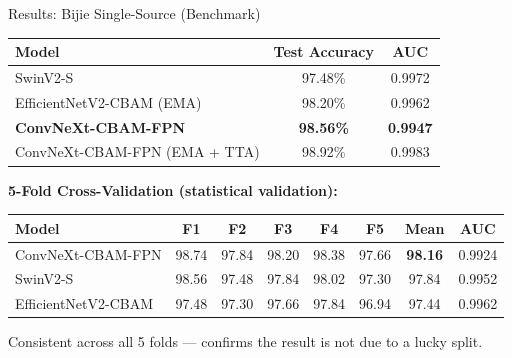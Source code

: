 \documentclass[aspectratio=169]{beamer}
\begin{document}
\begin{frame}{Results: Bijie Single-Source (Benchmark)}
    \begin{table}
        \centering
        \begin{tabular}{lcc}
            \toprule
            \textbf{Model} & \textbf{Test Accuracy} & \textbf{AUC} \\
            \midrule
            SwinV2-S & 97.48\% & 0.9972 \\
            EfficientNetV2-CBAM (EMA) & 98.20\% & 0.9962 \\
            \textbf{ConvNeXt-CBAM-FPN} & \textbf{98.56\%} & \textbf{0.9947} \\
            ConvNeXt-CBAM-FPN (EMA + TTA) & 98.92\% & 0.9983 \\
            \bottomrule
        \end{tabular}
    \end{table}

    \vspace{0.2cm}
    \textbf{5-Fold Cross-Validation (statistical validation):}
    \begin{table}
        \centering
        \small
        \begin{tabular}{lccccccc}
            \toprule
            \textbf{Model} & \textbf{F1} & \textbf{F2} & \textbf{F3} & \textbf{F4} & \textbf{F5} & \textbf{Mean} & \textbf{AUC} \\
            \midrule
            ConvNeXt-CBAM-FPN & 98.74 & 97.84 & 98.20 & 98.38 & 97.66 & \textbf{98.16} & 0.9924 \\
            SwinV2-S & 98.56 & 97.48 & 97.84 & 98.02 & 97.30 & 97.84 & 0.9952 \\
            EfficientNetV2-CBAM & 97.48 & 97.30 & 97.66 & 97.84 & 96.94 & 97.44 & 0.9962 \\
            \bottomrule
        \end{tabular}
    \end{table}
    Consistent across all 5 folds --- confirms the result is not due to a lucky split.
\end{frame}
\end{document}
